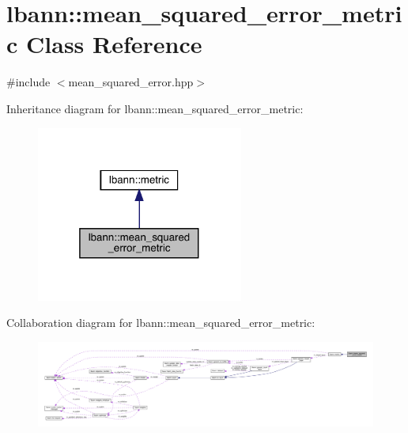 \hypertarget{classlbann_1_1mean__squared__error__metric}{}\section{lbann\+:\+:mean\+\_\+squared\+\_\+error\+\_\+metric Class Reference}
\label{classlbann_1_1mean__squared__error__metric}


{\ttfamily \#include $<$mean\+\_\+squared\+\_\+error.\+hpp$>$}



Inheritance diagram for lbann\+:\+:mean\+\_\+squared\+\_\+error\+\_\+metric\+:\nopagebreak
\begin{figure}[H]
\begin{center}
\leavevmode
\includegraphics[width=193pt]{classlbann_1_1mean__squared__error__metric__inherit__graph}
\end{center}
\end{figure}


Collaboration diagram for lbann\+:\+:mean\+\_\+squared\+\_\+error\+\_\+metric\+:\nopagebreak
\begin{figure}[H]
\begin{center}
\leavevmode
\includegraphics[width=350pt]{classlbann_1_1mean__squared__error__metric__coll__graph}
\end{center}
\end{figure}
